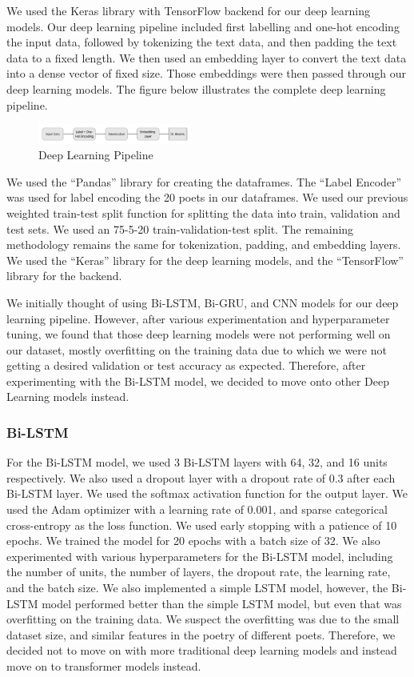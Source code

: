 We used the Keras library with TensorFlow backend for our deep learning models. Our deep learning pipeline included first labelling and one-hot encoding the input data, followed by tokenizing the text data, and then padding the text data to a fixed length. We then used an embedding layer to convert the text data into a dense vector of fixed size. Those embeddings were then passed through our deep learning models. The figure below illustrates the complete deep learning pipeline.

\begin{figure}[H]
    \centering
    \includegraphics[width=0.45\textwidth]{dl_pipe.png}
    \caption{Deep Learning Pipeline}
\end{figure}

We used the ``Pandas'' library for creating the dataframes. The ``Label Encoder'' was used for label encoding the 20 poets in our dataframes. We used our previous weighted train-test split function for splitting the data into train, validation and test sets. We used an 75-5-20 train-validation-test split. The remaining methodology remains the same for tokenization, padding, and embedding layers. We used the ``Keras'' library for the deep learning models, and the ``TensorFlow'' library for the backend.

We initially thought of using Bi-LSTM, Bi-GRU, and CNN models for our deep learning pipeline. However, after various experimentation and hyperparameter tuning, we found that those deep learning models were not performing well on our dataset, mostly overfitting on the training data due to which we were not getting a desired validation or test accuracy as expected. Therefore, after experimenting with the Bi-LSTM model, we decided to move onto other Deep Learning models instead. 

\subsubsection{Bi-LSTM}
For the Bi-LSTM model, we used 3 Bi-LSTM layers with 64, 32, and 16 units respectively. We also used a dropout layer with a dropout rate of 0.3 after each Bi-LSTM layer. We used the softmax activation function for the output layer. We used the Adam optimizer with a learning rate of 0.001, and sparse categorical cross-entropy as the loss function. We used early stopping with a patience of 10 epochs. We trained the model for 20 epochs with a batch size of 32. We also experimented with various hyperparameters for the Bi-LSTM model, including the number of units, the number of layers, the dropout rate, the learning rate, and the batch size. We also implemented a simple LSTM model, however, the Bi-LSTM model performed better than the simple LSTM model, but even that was overfitting on the training data. We suspect the overfitting was due to the small dataset size, and similar features in the poetry of different poets. Therefore, we decided not to move on with more traditional deep learning models and instead move on to transformer models instead.



